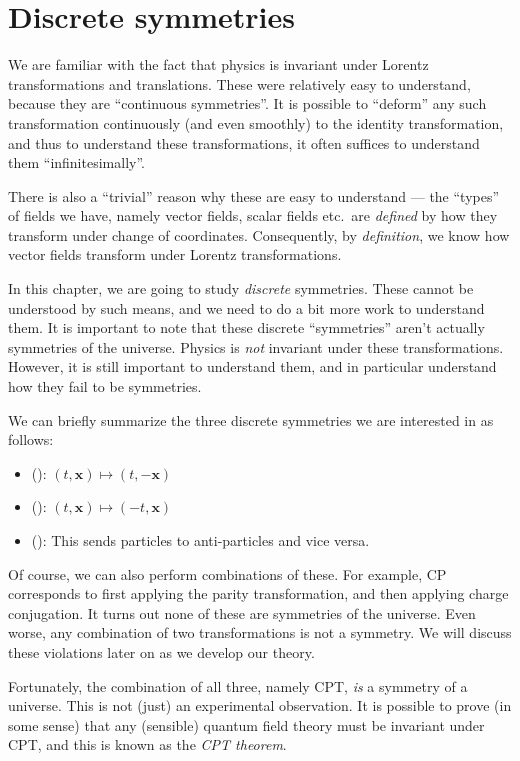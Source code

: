 \documentclass[a4paper]{article}
\begin{document}
\section{Discrete symmetries}
We are familiar with the fact that physics is invariant under Lorentz transformations and translations. These were relatively easy to understand, because they are ``continuous symmetries''. It is possible to ``deform'' any such transformation continuously (and even smoothly) to the identity transformation, and thus to understand these transformations, it often suffices to understand them ``infinitesimally''.

There is also a ``trivial'' reason why these are easy to understand --- the ``types'' of fields we have, namely vector fields, scalar fields etc.\ are \emph{defined} by how they transform under change of coordinates. Consequently, by \emph{definition}, we know how vector fields transform under Lorentz transformations.

In this chapter, we are going to study \emph{discrete} symmetries. These cannot be understood by such means, and we need to do a bit more work to understand them. It is important to note that these discrete ``symmetries'' aren't actually symmetries of the universe. Physics is \emph{not} invariant under these transformations. However, it is still important to understand them, and in particular understand how they fail to be symmetries.

We can briefly summarize the three discrete symmetries we are interested in as follows:
\begin{itemize}
  \item {} (): $(t, \mathbf{x}) \mapsto (t, -\mathbf{x})$
  \item {} (): $(t, \mathbf{x}) \mapsto (-t, \mathbf{x})$
  \item {} (): This sends particles to anti-particles and vice versa.
\end{itemize}
Of course, we can also perform combinations of these. For example, CP corresponds to first applying the parity transformation, and then applying charge conjugation. It turns out none of these are symmetries of the universe. Even worse, any combination of two transformations is not a symmetry. We will discuss these violations later on as we develop our theory.

Fortunately, the combination of all three, namely CPT, \emph{is} a symmetry of a universe. This is not (just) an experimental observation. It is possible to prove (in some sense) that any (sensible) quantum field theory must be invariant under CPT, and this is known as the \emph{CPT theorem}.
\end{document}
